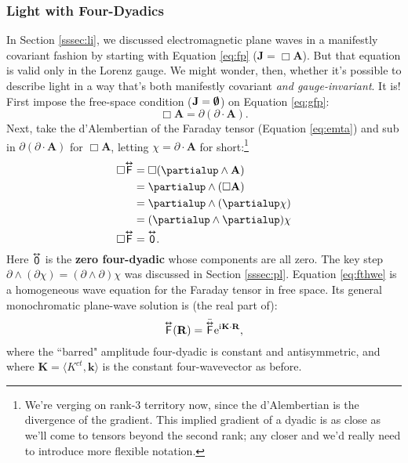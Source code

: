 \documentclass[12pt]{article}
\renewcommand{\vv}[1]{\mathbf{#1}}
\newcommand{\tightoverset}[2]{%
  \mathop{#2}\limits^{\vbox to -.5ex{\kern-0.75ex\hbox{$#1$}\vss}}}
\newcommand{\inlinedy}[1]{\tightoverset{\text{\tiny$\bm\leftrightarrow$}}{#1}}
\newcommand{\capdy}[1]{ \overset{ \text{\tiny$\bm\leftrightarrow$} }{\vphantom{\text{\small{A}}}\smash{#1}} }
\begin{document}
\subsubsection{Light with Four-Dyadics}

In Section \ref{sssec:li}, we discussed electromagnetic plane waves in a manifestly covariant fashion by starting with Equation \ref{eq:fp} ($\vv J = \Box \vv A$). But that equation is valid only in the Lorenz gauge. We might wonder, then, whether it's possible to describe light in a way that's both manifestly covariant \emph{and gauge-invariant}. It is! First impose the free-space condition ($\vv J = \textrm{\mbox{\boldmath $\emptyset$}}$) on Equation \ref{eq:gfp}:
\begin{equation*}
\Box \vv A = \partialup(\partialup \cdot \vv A).
\end{equation*}
Next, take the d'Alembertian of the Faraday tensor (Equation \ref{eq:emta}) and sub in $\partialup(\partialup \cdot \vv A)$ for $\Box \vv A$, letting $\chi = \partialup \cdot \vv A$ for short:\footnote{We're verging on rank-3 territory now, since the d'Alembertian is the divergence of the gradient. This implied gradient of a dyadic is as close as we'll come to tensors beyond the second rank; any closer and we'd really need to introduce more flexible notation.}
\begin{equation}\label{eq:fthwe}
\begin{split}
\Box \capdy{\mathsf{F}} &= \Box ( \partialup \wedge \vv A ) \\
&= \partialup \wedge ( \Box \vv A) \\
&= \partialup \wedge (\partialup \chi) \\
&= ( \partialup \wedge \partialup ) \chi \\
\Box \capdy{\mathsf{F}} &= \capdy{\mathsf{0}} .
\end{split}
\end{equation}
Here $\inlinedy{\mathsf{0}}$ is the \textbf{zero four-dyadic} whose components are all zero. The key step $\partialup \wedge (\partialup \chi) = (\partialup \wedge \partialup) \chi$ was discussed in Section \ref{sssec:pl}. Equation \ref{eq:fthwe} is a homogeneous wave equation for the Faraday tensor in free space. Its general monochromatic plane-wave solution is (the real part of):
\begin{equation}\label{eq:ftwe}
\capdy{\mathsf{F}} (\vv R) = \bar{\capdy{\mathsf{F}}} \mathrm{e}^{\mathrm{i} \mkern.5mu \vv K \cdot \vv R} ,
\end{equation}
where the ``barred" amplitude four-dyadic is constant and antisymmetric, and where $\vv K = \langle K^{ct}, \vv k \rangle$ is the constant four-wavevector as before.
\end{document}
